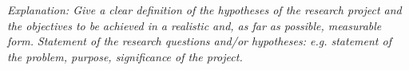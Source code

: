 % 
% 

\emph{Explanation: Give a clear definition of the hypotheses of the research
project and the objectives to be achieved in a realistic and, as far as
possible, measurable form.}
\emph{Statement of the research questions and/or hypotheses: e.g. statement of the problem, purpose, significance of the project.
}






% 
